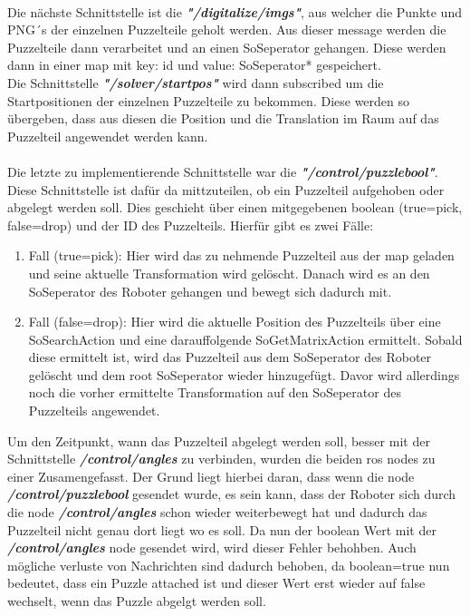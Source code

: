\\
Die nächste Schnittstelle ist die \textbf{\textit{"/digitalize/imgs"}}, aus welcher die Punkte und PNG´s der einzelnen Puzzelteile geholt werden. Aus dieser message werden die Puzzelteile dann verarbeitet und an einen SoSeperator gehangen. Diese werden dann in einer map mit key: id und value: SoSeperator* gespeichert.\\
Die Schnittstelle \textbf{\textit{"/solver/startpos"}} wird dann subscribed um die Startpositionen der einzelnen Puzzelteile zu bekommen. Diese werden so übergeben, dass aus diesen die Position und die Translation im Raum auf das Puzzelteil angewendet werden kann.\\
\\
Die letzte zu implementierende Schnittstelle war die \textbf{\textit{"/control/puzzlebool"}}. Diese Schnittstelle ist dafür da mittzuteilen, ob ein Puzzelteil aufgehoben oder abgelegt werden soll. Dies geschieht über einen mitgegebenen boolean (true=pick, false=drop) und der ID des Puzzelteils. Hierfür gibt es zwei Fälle:
\begin{enumerate}
    \item Fall (true=pick): Hier wird das zu nehmende Puzzelteil aus der map geladen und seine aktuelle Transformation wird gelöscht. Danach wird es an den SoSeperator des Roboter gehangen und bewegt sich dadurch mit.
    \item Fall (false=drop): Hier wird die aktuelle Position des Puzzelteils über eine SoSearchAction und eine darauffolgende SoGetMatrixAction ermittelt. Sobald diese ermittelt ist, wird das Puzzelteil aus dem SoSeperator des Roboter gelöscht und dem root SoSeperator wieder hinzugefügt. Davor wird allerdings noch die vorher ermittelte Transformation auf den SoSeperator des Puzzelteils angewendet.
\end{enumerate}
Um den Zeitpunkt, wann das Puzzelteil abgelegt werden soll, besser mit der Schnittstelle \textbf{\textit{/control/angles}} zu verbinden, wurden die beiden ros nodes zu einer Zusamengefasst. Der Grund liegt hierbei daran, dass wenn die node \textbf{\textit{/control/puzzlebool}} gesendet wurde, es sein kann, dass der Roboter sich durch die node \textbf{\textit{/control/angles}} schon wieder weiterbewegt hat und dadurch das Puzzelteil nicht genau dort liegt wo es soll. Da nun der boolean Wert mit der \textbf{\textit{/control/angles}} node gesendet wird, wird dieser Fehler behohben. Auch mögliche verluste von Nachrichten sind dadurch behoben, da boolean=true nun bedeutet, dass ein Puzzle attached ist und dieser Wert erst wieder auf false wechselt, wenn das Puzzle abgelgt werden soll.\\
